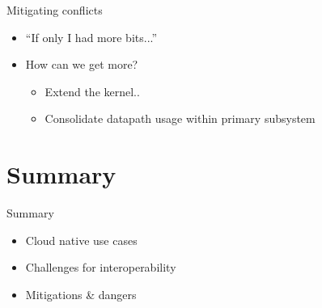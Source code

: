 \documentclass[black,white,aspectratio=169]{beamer}
\DeclareRobustCommand{\#}{\adjustbox{valign=B,totalheight=.57\baselineskip}{\oldhash}}%
\newcommand\todo[1]{
    \textcolor{red}{#1}
}
\begin{document}
    \begin{frame}{Mitigating conflicts}
        \begin{itemize}
            \item ``If only I had more bits...''~\medskip
            \item How can we get more?~\smallskip
            \begin{itemize}
                \item Extend the kernel..~\smallskip
                \item Consolidate datapath usage within primary subsystem~\medskip
            \end{itemize}
        \end{itemize}
    \end{frame}


    \section*{Summary}
    \begin{frame}{Summary}
        \begin{itemize}
            \item Cloud native use cases~\medskip
            \item Challenges for interoperability~\medskip
            \item Mitigations \& dangers~\medskip
        \end{itemize}
    \end{frame}
\end{document}
